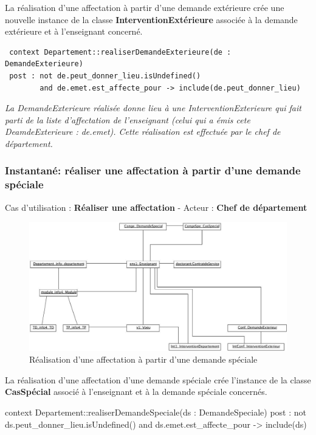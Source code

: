  \indent La réalisation d'une affectation à partir d'une demande extérieure crée une nouvelle instance de la classe \textbf{InterventionExtérieure} associée à la demande extérieure et à l'enseignant concerné.

 \begin{verbatim}
 context Departement::realiserDemandeExterieure(de : DemandeExterieure)
 post : not de.peut_donner_lieu.isUndefined()
        and de.emet.est_affecte_pour -> include(de.peut_donner_lieu)
 \end{verbatim}
 \emph{La DemandeExterieure réalisée donne lieu à une InterventionExterieure qui fait parti de la liste d'affectation de l'enseignant (celui qui a émis cete DeamdeExterieure : de.emet). Cette réalisation est effectuée par le chef de département.}


 \subsubsection{Instantané: réaliser une affectation à partir d'une demande spéciale}
 \indent Cas d'utilisation : \textbf{Réaliser une affectation} - Acteur : \textbf{Chef de département}

 \begin{figure}[!htbp]
 \begin{center}
 \includegraphics[width=14cm]{fig/8-RealisationSpecial.jpg}
 \caption{Réalisation d'une affectation à partir d'une demande spéciale}
 \end{center}
 \end{figure}

 \indent La réalisation d'une affectation d'une demande spéciale crée l'instance de la classe \textbf{CasSpécial} associé à l'enseignant et à la demande spéciale concernés.

 \begin{ocl}
 context Departement::realiserDemandeSpeciale(ds : DemandeSpeciale)
 post : not ds.peut_donner_lieu.isUndefined()
        and ds.emet.est_affecte_pour -> include(ds)
 \end{ocl}
 
